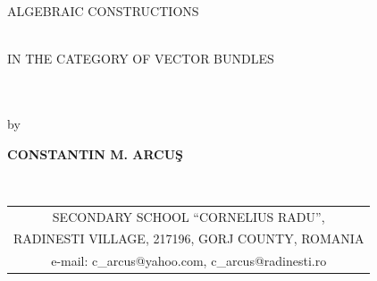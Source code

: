 \documentclass[11pt]{article}
\begin{document}
\begin{center}
{\Large ALGEBRAIC CONSTRUCTIONS }

\ \ \\[0pt]

{\Large IN THE CATEGORY OF VECTOR BUNDLES}

\ \ \\[0pt]


\ \ \\[0pt]
by


\textbf{{CONSTANTIN M. ARCU\c{S} }}

\ \ \\[0pt]

\begin{tabular}{c}
SECONDARY SCHOOL \textquotedblleft CORNELIUS RADU\textquotedblright , \\
RADINESTI VILLAGE, 217196, GORJ COUNTY, ROMANIA \\
e-mail: c\_arcus@yahoo.com, c\_arcus@radinesti.ro%
\end{tabular}
\end{center}



\ \ \\[0pt]





\


\begin{abstract}
The category of generalized Lie algebroids is presented. We obtain an
exterior differential calculus for generalized Lie algebroids. In
particular, we obtain similar results with the classical and modern results
for Lie algebroids. So, a new result of Maurer-Cartan type is presented.
Supposing that any vector subbundle of the pull-back vector bundle of a
generalized Lie algebroid is called \emph{interior differential system (IDS)}
for that generalized Lie algebroid, a theorem of Cartan type is obtained.
Extending the classical notion of \emph{exterior differential system (EDS)}
to generalized Lie algebroids, a theorem of Cartan type is obtained. Using
the theory of linear connections of Ehresmann type presented in the paper $%
\left[ 1\right]$, the identities of Cartan and Bianchi type are presented. \
\ \ \ \bigskip\newline
\textbf{2000 Mathematics Subject Classification:} 00A69, 58A15,
58B34.\bigskip\newline
\ \ \ \textbf{Keywords:} vector bundle, (generalized) Lie algebroid,
interior differential system, exterior differential calculus, exterior
differential system, Cartan identities, Bianchi identities.
\end{abstract}
\end{document}
